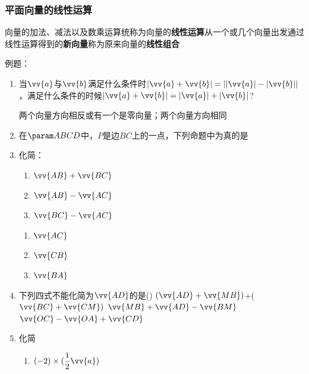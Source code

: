 \subsubsection*{平面向量的线性运算}
向量的加法、减法以及数乘运算统称为向量的\textbf{线性运算}从一个或几个向量出发通过线性运算得到的\textbf{新向量}称为原来向量的\textbf{线性组合}

例题：
\begin{enumerate}
    \item 当$\vv{a}$与$\vv{b}$满足什么条件时$|\vv{a} + \vv{b}| = ||\vv{a}| - |\vv{b}||$，满足什么条件的时候$|\vv{a} + \vv{b}| = |\vv{a}| + |\vv{b}|$?
    \begin{jieda}
        两个向量方向相反或有一个是零向量；两个向量方向相同
    \end{jieda}
    \item 在$\param ABCD$中，$P$是边$BC$上的一点，下列命题中为真的是
    \item 化简：
    \begin{enumerate}
        \item $\vv{AB} + \vv{BC}$
        \item $\vv{AB} - \vv{AC}$
        \item $\vv{BC} - \vv{AC}$
    \end{enumerate}
    \begin{jieda}
        \begin{enumerate}
            \item $\vv{AC}$
            \item $\vv{CB}$
            \item $\vv{BA}$
        \end{enumerate}
    \end{jieda}
    \item 下列四式不能化简为$\vv{AD}$的是\dotfill()
    {$(\vv{AD}+\vv{MB})$+($\vv{BC}+\vv{CM})$}
    {$\vv{MB}+\vv{AD}-\vv{BM}$}
    {$\vv{OC}-\vv{OA}+\vv{CD}$}
    \item 化简
    \begin{enumerate}
        \item $(-2) \times (\dfrac{1}{2} \vv{a})$

\end{enumerate}
\end{enumerate}
